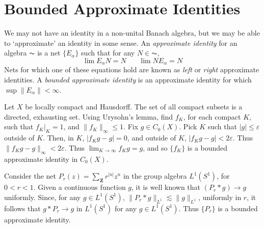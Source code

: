 \section{Bounded Approximate Identities}

We may not have an identity in a non-unital Banach algebra, but we may be able to `approximate' an identity in some sense. An \emph{approximate identity} for an algebra $\AC$ is a net $\{ E_\alpha \}$ such that for any $N \in \AC$,
%
\[ \lim E_\alpha N = N\ \ \ \ \ \ \ \ \lim N E_\alpha = N \]
%
Nets for which one of these equations hold are known as \emph{left} or \emph{right} approximate identities. A \emph{bounded approximate identity} is an approximate identity for which $\sup \| E_\alpha \| < \infty$.

\begin{example}
    Let $X$ be locally compact and Hausdorff. The set of all compact subsets is a directed, exhausting set. Using Urysohn's lemma, find $f_K$, for each compact $K$, such that $f_K |_K = 1$, and $\| f_K \|_\infty \leq 1$. Fix $g \in C_0(X)$. Pick $K$ such that $|g| \leq \varepsilon$ outside of $K$. Then, in $K$, $|f_K g - g| = 0$, and outside of $K$, $|f_K g - g| < 2 \varepsilon$. Thus $\| f_K g - g \|_\infty < 2 \varepsilon$. Thus $\lim_{K \to \infty} f_K g = g$, and so $\{ f_K \}$ is a bounded approximate identity in $C_0(X)$.
\end{example}

\begin{example}
    Consider the net $P_r(z) = \sum_\mathbf{Z} r^{|n|} z^n$ in the group algebra $L^1(S^1)$, for $0 < r < 1$. Given a continuous function $g$, it is well known that $(P_r * g) \to g$ uniformly. Since, for any $g \in L^1(S^1)$, $\| P_r * g \|_{L^1} \lesssim \| g \|_{L^1}$, uniformly in $r$, it follows that $g * P_r \to g$ in $L^1(S^1)$ for any $g \in L^1(S^1)$. Thus $\{ P_r \}$ is a bounded approximate identity.
\end{example}

